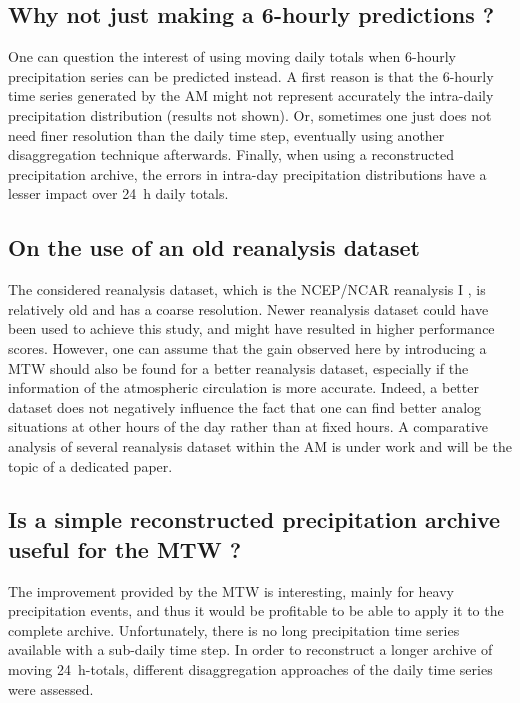 \documentclass[hess, manuscript]{copernicus}
\begin{document}
\subsection{Why not just making a 6-hourly predictions ?}

One can question the interest of using moving daily totals when 6-hourly precipitation series can be predicted instead. A first reason is that the 6-hourly time series generated by the AM might not represent accurately the intra-daily precipitation distribution (results not shown). Or, sometimes one just does not need finer resolution than the daily time step, eventually using another disaggregation technique afterwards. Finally, when using a reconstructed precipitation archive, the errors in intra-day precipitation distributions have a lesser impact over 24~h daily totals.

\subsection{On the use of an old reanalysis dataset}

The considered reanalysis dataset, which is the NCEP/NCAR reanalysis I \citep{Kalnay1996}, is relatively old and has a coarse resolution. Newer reanalysis dataset could have been used to achieve this study, and might have resulted in higher performance scores. However, one can assume that the gain observed here by introducing a MTW should also be found for a better reanalysis dataset, especially if the information of the atmospheric circulation is more accurate. Indeed, a better dataset does not negatively influence the fact that one can find better analog situations at other hours of the day rather than at fixed hours. A comparative analysis of several reanalysis dataset within the AM is under work and will be the topic of a dedicated paper.

\subsection{Is a simple reconstructed precipitation archive useful for the MTW ?}

The improvement provided by the MTW is interesting, mainly for heavy precipitation events, and thus it would be profitable to be able to apply it to the complete archive. Unfortunately, there is no long precipitation time series available with a sub-daily time step. In order to reconstruct a longer archive of moving 24~h-totals, different disaggregation approaches of the daily time series were assessed.
\end{document}
